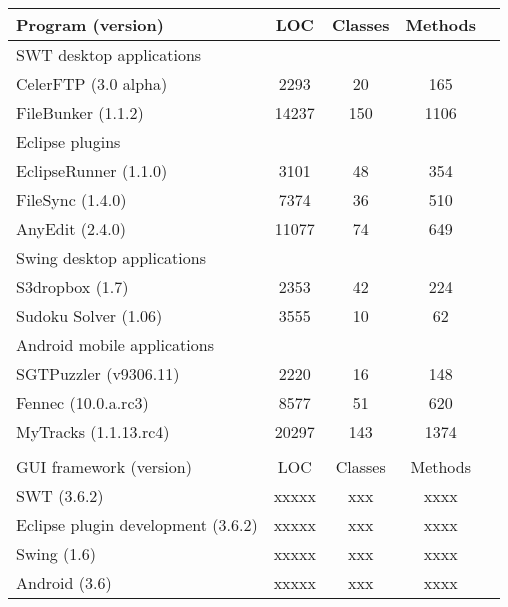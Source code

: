 \begin{table}[t]
\begin{center}
 \fontsize{9pt}{\baselineskip}\selectfont
\hspace*{-0.2cm}
\begin{tabular}{|p{4.4cm}||c|c|c|c|}
\hline
 Program (version) & LOC & Classes & Methods \\
\hline \hline
\multicolumn{4}{|l|}{SWT desktop applications}   \\
 \hline
 CelerFTP (3.0 alpha) &  2293 &  20 &  165  \\
 \hline
 FileBunker (1.1.2)&  14237 &  150 &  1106  \\
 \hline
 \hline
\multicolumn{4}{|l|}{Eclipse plugins}   \\
 \hline
 EclipseRunner (1.1.0) &  3101 &  48 &  354\\
 \hline
 FileSync (1.4.0)&  7374 &  36 &  510 \\
 \hline
 AnyEdit (2.4.0)&  11077 &  74 &  649 \\
 \hline
 \hline
\multicolumn{4}{|l|}{Swing desktop applications}   \\
 \hline
 S3dropbox (1.7) &  2353 &  42  &  224 \\
 \hline
 Sudoku Solver (1.06)&  3555 &  10 &  62 \\
 \hline
 \hline
\multicolumn{4}{|l|}{Android mobile applications}   \\
 \hline
 SGTPuzzler (v9306.11)&  2220 &  16 &  148 \\
 \hline
 Fennec (10.0.a.rc3)&  8577 &  51 &  620 \\
 \hline
 MyTracks (1.1.13.rc4)&  20297 &  143 &  1374 \\
\hline
\multicolumn{4}{l}{}   \\
\hline
 GUI framework (version) & LOC & Classes & Methods  \\
\hline \hline
 SWT (3.6.2)&  xxxxx &  xxx &  xxxx  \\
\hline
 Eclipse plugin development (3.6.2)&  xxxxx &  xxx &  xxxx  \\
\hline
Swing (1.6)&  xxxxx &  xxx &  xxxx  \\
\hline
 Android (3.6)&  xxxxx &  xxx &  xxxx  \\
\hline
\end{tabular}

\end{center}
\vspace{-15pt}
\end{table}


